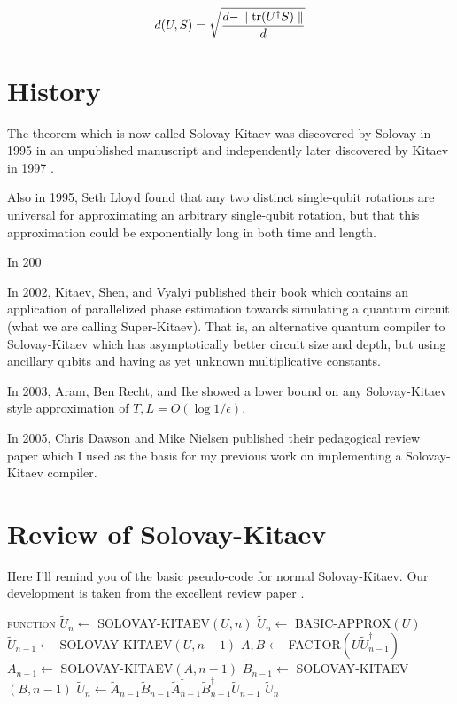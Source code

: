 \documentclass{article}
\theoremstyle{plain}
\begin{document}
\begin{equation}
d(U,S) = \sqrt{\frac{d - \parallel \mathrm{tr}(U^\dagger S) \parallel}{d}}
\end{equation}

\section{History}

The theorem which is now called Solovay-Kitaev was discovered by Solovay in
1995 in an unpublished manuscript and independently later discovered by
Kitaev in 1997 \cite{nc00}.

Also in 1995, Seth Lloyd found that any two distinct single-qubit rotations are
universal for approximating an arbitrary single-qubit rotation, but that this
approximation could be exponentially long in both time and length.

In 200

In 2002, Kitaev, Shen, and Vyalyi published their book which contains an
application of parallelized phase estimation towards simulating a quantum
circuit (what we are calling Super-Kitaev).
That is, an alternative quantum compiler to Solovay-Kitaev which has
asymptotically better circuit size and depth, but using ancillary qubits
and having as yet unknown multiplicative constants.

In 2003, Aram, Ben Recht, and Ike showed a lower bound on any Solovay-Kitaev
style approximation of $T,L = O(\log{1/\epsilon})$.

In 2005, Chris Dawson and Mike Nielsen published their pedagogical review
paper which I used as the basis for my previous work on implementing a
Solovay-Kitaev compiler.

\section{Review of Solovay-Kitaev}

Here I'll remind you of the basic pseudo-code for normal Solovay-Kitaev.
Our development is taken from the excellent review paper \cite{Dawson2005}.

\begin{algorithmic}[1]
\STATE \textsc{function} $\tilde{U}_n \leftarrow$ SOLOVAY-KITAEV$(U,n)$
\STATE $\tilde{U}_n \leftarrow $ BASIC-APPROX$(U)$
\ELSE
\STATE $\tilde{U}_{n-1} \leftarrow$ SOLOVAY-KITAEV$(U, n-1)$
\STATE $A,B \leftarrow $ FACTOR$(U\tilde{U}^\dagger_{n-1})$
\STATE $\tilde{A}_{n-1} \leftarrow $ SOLOVAY-KITAEV$(A, n-1)$
\STATE $\tilde{B}_{n-1} \leftarrow $ SOLOVAY-KITAEV$(B, n-1)$
\STATE $\tilde{U}_n \leftarrow \tilde{A}_{n-1}\tilde{B}_{n-1}\tilde{A}^\dagger_{n-1}\tilde{B}^\dagger_{n-1}\tilde{U}_{n-1}$
\ENDIF
\RETURN $\tilde{U}_n$
\end{algorithmic}
\end{document}
